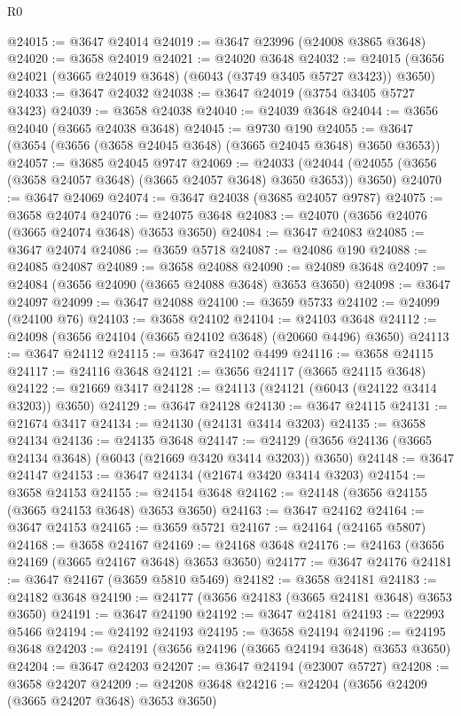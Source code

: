\begin{lexlean}{R0}
\begin{coremodule}
@24015 := @3647 @24014
@24019 := @3647 @23996 (@24008 @3865 @3648)
@24020 := @3658 @24019
@24021 := @24020 @3648
@24032 := @24015 (@3656 @24021 (@3665 @24019 @3648) (@6043 (@3749 @3405 @5727 @3423)) @3650)
@24033 := @3647 @24032
@24038 := @3647 @24019 (@3754 @3405 @5727 @3423)
@24039 := @3658 @24038
@24040 := @24039 @3648
@24044 := @3656 @24040 (@3665 @24038 @3648)
@24045 := @9730 @190
@24055 := @3647 (@3654 (@3656 (@3658 @24045 @3648) (@3665 @24045 @3648) @3650 @3653))
@24057 := @3685 @24045 @9747
@24069 := @24033
    (@24044 (@24055 (@3656 (@3658 @24057 @3648) (@3665 @24057 @3648) @3650 @3653)) @3650)
@24070 := @3647 @24069
@24074 := @3647 @24038 (@3685 @24057 @9787)
@24075 := @3658 @24074
@24076 := @24075 @3648
@24083 := @24070 (@3656 @24076 (@3665 @24074 @3648) @3653 @3650)
@24084 := @3647 @24083
@24085 := @3647 @24074
@24086 := @3659 @5718
@24087 := @24086 @190
@24088 := @24085 @24087
@24089 := @3658 @24088
@24090 := @24089 @3648
@24097 := @24084 (@3656 @24090 (@3665 @24088 @3648) @3653 @3650)
@24098 := @3647 @24097
@24099 := @3647 @24088
@24100 := @3659 @5733
@24102 := @24099 (@24100 @76)
@24103 := @3658 @24102
@24104 := @24103 @3648
@24112 := @24098 (@3656 @24104 (@3665 @24102 @3648) (@20660 @4496) @3650)
@24113 := @3647 @24112
@24115 := @3647 @24102 @4499
@24116 := @3658 @24115
@24117 := @24116 @3648
@24121 := @3656 @24117 (@3665 @24115 @3648)
@24122 := @21669 @3417
@24128 := @24113 (@24121 (@6043 (@24122 @3414 @3203)) @3650)
@24129 := @3647 @24128
@24130 := @3647 @24115
@24131 := @21674 @3417
@24134 := @24130 (@24131 @3414 @3203)
@24135 := @3658 @24134
@24136 := @24135 @3648
@24147 := @24129 (@3656 @24136 (@3665 @24134 @3648) (@6043 (@21669 @3420 @3414 @3203)) @3650)
@24148 := @3647 @24147
@24153 := @3647 @24134 (@21674 @3420 @3414 @3203)
@24154 := @3658 @24153
@24155 := @24154 @3648
@24162 := @24148 (@3656 @24155 (@3665 @24153 @3648) @3653 @3650)
@24163 := @3647 @24162
@24164 := @3647 @24153
@24165 := @3659 @5721
@24167 := @24164 (@24165 @5807)
@24168 := @3658 @24167
@24169 := @24168 @3648
@24176 := @24163 (@3656 @24169 (@3665 @24167 @3648) @3653 @3650)
@24177 := @3647 @24176
@24181 := @3647 @24167 (@3659 @5810 @5469)
@24182 := @3658 @24181
@24183 := @24182 @3648
@24190 := @24177 (@3656 @24183 (@3665 @24181 @3648) @3653 @3650)
@24191 := @3647 @24190
@24192 := @3647 @24181
@24193 := @22993 @5466
@24194 := @24192 @24193
@24195 := @3658 @24194
@24196 := @24195 @3648
@24203 := @24191 (@3656 @24196 (@3665 @24194 @3648) @3653 @3650)
@24204 := @3647 @24203
@24207 := @3647 @24194 (@23007 @5727)
@24208 := @3658 @24207
@24209 := @24208 @3648
@24216 := @24204 (@3656 @24209 (@3665 @24207 @3648) @3653 @3650)

\end{coremodule}
\end{lexlean}
